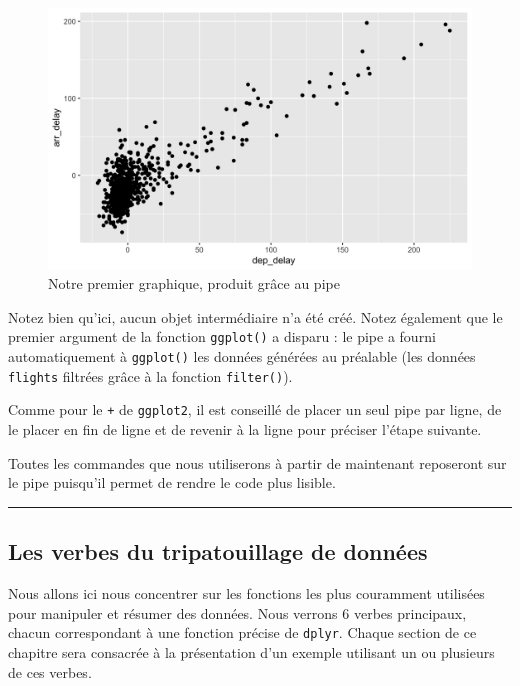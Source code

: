 \documentclass[a4paperpaper,]{article}
\theoremstyle{definition}
\theoremstyle{definition}
\theoremstyle{definition}
\theoremstyle{remark}
\begin{document}
\begin{figure}[htpb]

{\centering \includegraphics[width=0.9\linewidth]{figure/unnamed-chunk-94-1} 

}

\caption{Notre premier graphique, produit grâce au pipe}\label{fig:unnamed-chunk-94}
\end{figure}

Notez bien qu'ici, aucun objet intermédiaire n'a été créé. Notez
également que le premier argument de la fonction \texttt{ggplot()} a
disparu : le pipe a fourni automatiquement à \texttt{ggplot()} les
données générées au préalable (les données \texttt{flights} filtrées
grâce à la fonction \texttt{filter()}).

Comme pour le \texttt{+} de \texttt{ggplot2}, il est conseillé de placer
un seul pipe par ligne, de le placer en fin de ligne et de revenir à la
ligne pour préciser l'étape suivante.

Toutes les commandes que nous utiliserons à partir de maintenant
reposeront sur le pipe puisqu'il permet de rendre le code plus lisible.

\begin{center}\rule{0.5\linewidth}{\linethickness}\end{center}

\subsection{Les verbes du tripatouillage de
données}\label{les-verbes-du-tripatouillage-de-donnees}

Nous allons ici nous concentrer sur les fonctions les plus couramment
utilisées pour manipuler et résumer des données. Nous verrons 6 verbes
principaux, chacun correspondant à une fonction précise de
\texttt{dplyr}. Chaque section de ce chapitre sera consacrée à la
présentation d'un exemple utilisant un ou plusieurs de ces verbes.
\end{document}
